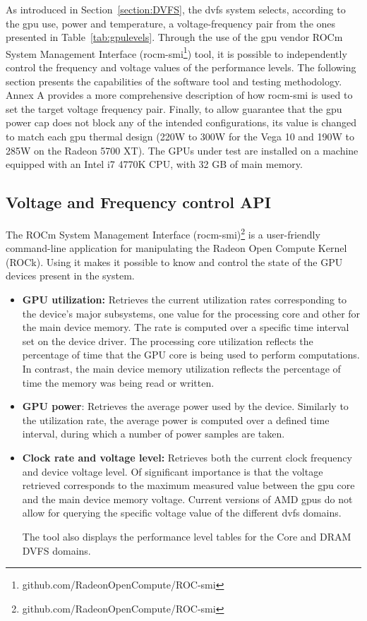 As introduced in Section~\ref{section:DVFS}, the  \acrshort{dvfs} system selects, according to the \acrshort{gpu} use, power and temperature, a voltage-frequency pair from the ones presented in Table~\ref{tab:gpulevels}. Through the use of the \acrshort{gpu} vendor ROCm System Management Interface (rocm-smi\footnote{github.com/RadeonOpenCompute/ROC-smi}) tool, it is possible to independently control the frequency and voltage values of the performance levels. The following section presents the capabilities of the software tool and testing methodology. Annex A provides a more comprehensive description of how rocm-smi is used to set the target voltage frequency pair. Finally, to allow guarantee that the  \acrshort{gpu} power cap does not block any of the intended configurations, its value is changed to match each \acrshort{gpu} thermal design (220W to 300W for the Vega 10 and 190W to 285W on the Radeon 5700 XT). The GPUs under test are installed on a machine equipped with an Intel i7 4770K CPU, with 32 GB of main memory. 




\subsection{Voltage and Frequency control API}
The ROCm System Management Interface (rocm-smi)\footnote{github.com/RadeonOpenCompute/ROC-smi} is a user-friendly command-line application for manipulating the Radeon Open Compute Kernel (ROCk). Using it makes it possible to know and control the state of the GPU devices present in the system. 

\begin{itemize}
\item \textbf{GPU utilization:} Retrieves the current utilization rates corresponding to the device's major subsystems, one value for the processing core and other for the main device memory. The rate is computed over a specific time interval set on the device driver. The processing core utilization reflects the percentage of time that the GPU core is being used to perform computations. In contrast, the main device memory utilization reflects the percentage of time the memory was being read or written.

\item \textbf{GPU power}: Retrieves the average power used by the device. Similarly to the utilization rate, the average power is computed over a defined time interval, during which a number of power samples are taken.

\item \textbf{Clock rate and voltage level:} Retrieves both the current clock frequency and device voltage level. Of significant importance is that the voltage retrieved corresponds to the maximum measured value between the \acrshort{gpu} core and the main device memory voltage. Current versions of AMD \acrshort{gpu}s do not allow for querying the specific voltage value of the different \acrshort{dvfs} domains.

The tool also displays the performance level tables for the Core and DRAM DVFS domains.
\end{itemize}

